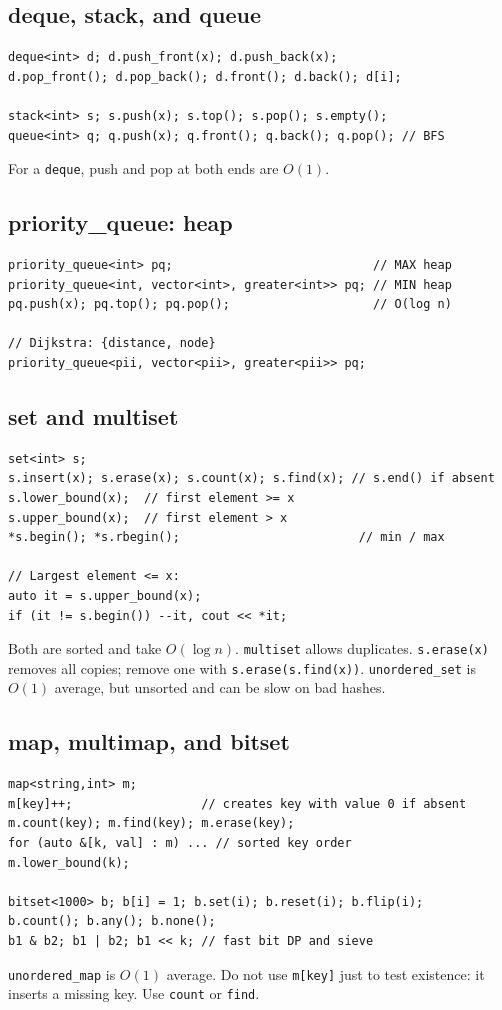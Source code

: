 \subsection{deque, stack, and queue}
\begin{lstlisting}
deque<int> d; d.push_front(x); d.push_back(x);
d.pop_front(); d.pop_back(); d.front(); d.back(); d[i];

stack<int> s; s.push(x); s.top(); s.pop(); s.empty();
queue<int> q; q.push(x); q.front(); q.back(); q.pop(); // BFS
\end{lstlisting}
For a \texttt{deque}, push and pop at both ends are $O(1)$.

\subsection{priority\_queue: heap}
\begin{lstlisting}
priority_queue<int> pq;                            // MAX heap
priority_queue<int, vector<int>, greater<int>> pq; // MIN heap
pq.push(x); pq.top(); pq.pop();                    // O(log n)

// Dijkstra: {distance, node}
priority_queue<pii, vector<pii>, greater<pii>> pq;
\end{lstlisting}

\subsection{set and multiset}
\begin{lstlisting}
set<int> s;
s.insert(x); s.erase(x); s.count(x); s.find(x); // s.end() if absent
s.lower_bound(x);  // first element >= x
s.upper_bound(x);  // first element > x
*s.begin(); *s.rbegin();                         // min / max

// Largest element <= x:
auto it = s.upper_bound(x);
if (it != s.begin()) --it, cout << *it;
\end{lstlisting}
Both are sorted and take $O(\log n)$. \texttt{multiset} allows duplicates. \texttt{s.erase(x)} removes all copies; remove one with \texttt{s.erase(s.find(x))}. \texttt{unordered\_set} is $O(1)$ average, but unsorted and can be slow on bad hashes.

\subsection{map, multimap, and bitset}
\begin{lstlisting}
map<string,int> m;
m[key]++;                  // creates key with value 0 if absent
m.count(key); m.find(key); m.erase(key);
for (auto &[k, val] : m) ... // sorted key order
m.lower_bound(k);

bitset<1000> b; b[i] = 1; b.set(i); b.reset(i); b.flip(i);
b.count(); b.any(); b.none();
b1 & b2; b1 | b2; b1 << k; // fast bit DP and sieve
\end{lstlisting}
\texttt{unordered\_map} is $O(1)$ average. Do not use \texttt{m[key]} just to test existence: it inserts a missing key. Use \texttt{count} or \texttt{find}.

